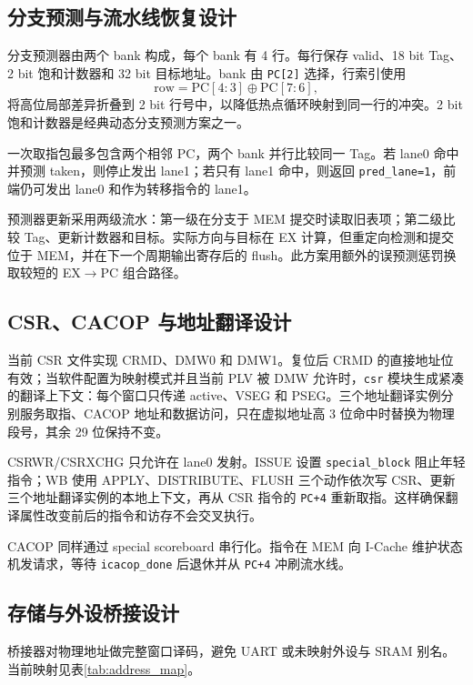 \documentclass[UTF8,a4paper,zihao=5,fontset=none]{ctexart}
\newcommand{\code}[1]{\nolinkurl{#1}}
\begin{document}
\subsection{分支预测与流水线恢复设计}

分支预测器由两个 bank 构成，每个 bank 有 4 行。每行保存 valid、18 bit Tag、2 bit 饱和计数器和 32 bit 目标地址。bank 由 \code{PC[2]} 选择，行索引使用
\[
  \text{row}=\text{PC}[4{:}3]\oplus \text{PC}[7{:}6],
\]
将高位局部差异折叠到 2 bit 行号中，以降低热点循环映射到同一行的冲突。2 bit 饱和计数器是经典动态分支预测方案之一。

一次取指包最多包含两个相邻 PC，两个 bank 并行比较同一 Tag。若 lane0 命中并预测 taken，则停止发出 lane1；若只有 lane1 命中，则返回 \code{pred_lane=1}，前端仍可发出 lane0 和作为转移指令的 lane1。

预测器更新采用两级流水：第一级在分支于 MEM 提交时读取旧表项；第二级比较 Tag、更新计数器和目标。实际方向与目标在 EX 计算，但重定向检测和提交位于 MEM，并在下一个周期输出寄存后的 flush。此方案用额外的误预测惩罚换取较短的 EX$\rightarrow$PC 组合路径。


\subsection{CSR、CACOP 与地址翻译设计}

当前 CSR 文件实现 CRMD、DMW0 和 DMW1。复位后 CRMD 的直接地址位有效；当软件配置为映射模式并且当前 PLV 被 DMW 允许时，\code{csr} 模块生成紧凑的翻译上下文：每个窗口只传递 active、VSEG 和 PSEG。三个地址翻译实例分别服务取指、CACOP 地址和数据访问，只在虚拟地址高 3 位命中时替换为物理段号，其余 29 位保持不变。

CSRWR/CSRXCHG 只允许在 lane0 发射。ISSUE 设置 \code{special_block} 阻止年轻指令；WB 使用 APPLY、DISTRIBUTE、FLUSH 三个动作依次写 CSR、更新三个地址翻译实例的本地上下文，再从 CSR 指令的 \code{PC+4} 重新取指。这样确保翻译属性改变前后的指令和访存不会交叉执行。

CACOP 同样通过 special scoreboard 串行化。指令在 MEM 向 I-Cache 维护状态机发请求，等待 \code{icacop_done} 后退休并从 \code{PC+4} 冲刷流水线。

\subsection{存储与外设桥接设计}

桥接器对物理地址做完整窗口译码，避免 UART 或未映射外设与 SRAM 别名。当前映射见表\ref{tab:address_map}。
\end{document}
